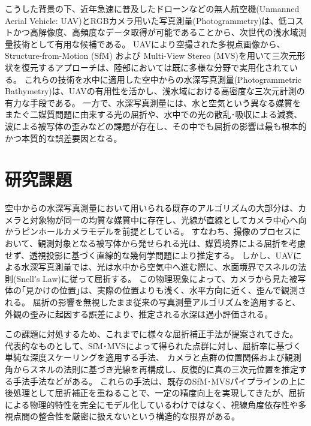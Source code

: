 こうした背景の下、近年急速に普及したドローンなどの無人航空機(Unmanned Aerial Vehicle: UAV)とRGBカメラ用いた写真測量(Photogrammetry)は、低コストかつ高解像度、高頻度なデータ取得が可能であることから、次世代の浅水域測量技術として有用な候補である。
UAVにより空撮された多視点画像から、Structure-from-Motion (SfM)\cite{schoenberger2016_colmap} および Multi-View Stereo (MVS)\cite{Furukawa2010_PatchMVS,Furukawa2015_MVS}を用いて三次元形状を復元するアプローチは、陸部においては既に多様な分野で実用化されている\cite{Bemis2014_UAV-photogrammetry,Gomez2016_UAV-photogrammetry-disaster,Iglhaut2019_UAV-photogrammetry-forestry}。
これらの技術を水中に適用した空中からの水深写真測量(Photogrammetric Bathymetry)は、UAVの有用性を活かし、浅水域における高密度な三次元計測の有力な手段である。
一方で、水深写真測量には、水と空気という異なる媒質をまたぐ二媒質問題に由来する光の屈折や、水中での光の散乱･吸収による減衰、波による被写体の歪みなどの課題が存在し、その中でも屈折の影響は最も根本的かつ本質的な誤差要因となる\cite{Murase2008_refractiveCorrection,Woodget2014_PhotograBathy-multiply-n,Dietrich2016_multi-angle-correction}。


\section{研究課題}\label{sec:intro-problem}

空中からの水深写真測量において用いられる既存のアルゴリズムの大部分は、カメラと対象物が同一の均質な媒質中に存在し、光線が直線としてカメラ中心へ向かうピンホールカメラモデルを前提としている。
すなわち、撮像のプロセスにおいて、観測対象となる被写体から発せられる光は、媒質境界による屈折を考慮せず、透視投影に基づく直線的な幾何学問題により推定する。
しかし、UAVによる水深写真測量では、光は水中から空気中へ進む際に、水面境界でスネルの法則(Snell's Law)に従って屈折する。
この物理現象によって、カメラから見た被写体の｢見かけの位置｣は、実際の位置よりも浅く、水平方向に近く、歪んで観測される。
屈折の影響を無視したまま従来の写真測量アルゴリズムを適用すると、外観の歪みに起因する誤差により、推定される水深は過小評価される\cite{westaway2001_PhotograBathy-multiply-n,Dietrich2016_multi-angle-correction}。

この課題に対処するため、これまでに様々な屈折補正手法が提案されてきた。
代表的なものとして、SfM･MVSによって得られた点群に対し、屈折率に基づく単純な深度スケーリングを適用する手法\cite{westaway2001_PhotograBathy-multiply-n,Woodget2014_PhotograBathy-multiply-n}、
カメラと点群の位置関係および観測角からスネルの法則に基づき光線を再構成し、反復的に真の三次元位置を推定する手法\cite{Murase2008_refractiveCorrection,Dietrich2016_multi-angle-correction}手法などがある。
これらの手法は、既存のSfM･MVSパイプラインの上に後処理として屈折補正を重ねることで、一定の精度向上を実現してきたが、屈折による物理的特性を完全にモデル化しているわけではなく、視線角度依存性や多視点間の整合性を厳密に扱えないという構造的な限界がある。

